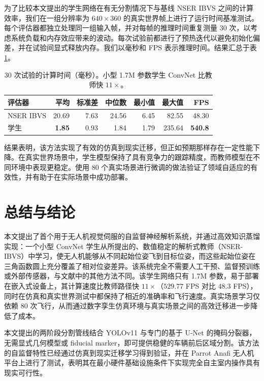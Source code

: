 \documentclass[10pt,twocolumn,letterpaper]{article}
\begin{document}
为了比较本文提出的学生网络在有无分割情况下与基线 NSER IBVS 之间的计算效率，我们在一组分辨率为 $640 \times 360$ 的真实世界帧上进行了运行时间基准测试。每个评估器都独立处理同一组输入帧，并对每帧的推理时间重复测量 30 次，以考虑系统负载和内存效应带来的波动。每次试验前都进行了预热迭代以避免初始化偏差，并在试验间显式释放内存。我们以毫秒和 FPS 表示推理时间。结果汇总于表 \ref{tab:nn-timing-eval}。

\begin{table}[t]
\centering
\footnotesize
\caption{30 次试验的计算时间（毫秒）。小型 1.7M 参数学生 ConvNet 比教师快 $11\times$。}
\label{tab:nn-timing-eval}
\begin{tabular}{lrrrrrr}
\toprule
\textbf{评估器} & \textbf{平均} & \textbf{标准差} & \textbf{中位数} & \textbf{最小值} & \textbf{最大值} & \textbf{FPS} \\
\midrule
NSER IBVS & 20.69 & 7.63 & 24.56 & 6.45 & 82.55 & 48.30 \\
学生 & \textbf{1.85} & 0.93 & 1.84 & 1.79 & 235.64 & \textbf{540.8} \\
\bottomrule
\end{tabular}
\end{table}

结果表明，该方法实现了有效的仿真到现实迁移，但正如预期那样存在一定性能下降。在真实世界场景中，学生模型保持了具有竞争力的跟踪精度，而教师模型在不同环境中表现更稳定。使用 80 个真实场景进行微调的做法验证了领域自适应的有效性，并有助于在实际场景中成功部署。

\section{总结与结论}
\label{sec:conclusion}
本文提出了首个用于无人机视觉伺服的自监督神经解析系统，并通过高效知识蒸馏实现：一个小型 ConvNet 学生从所提出的、数值稳定的解析式教师（NSER-IBVS）中学习，使无人机能够从不同起始位姿飞到目标位姿，而这些起始位姿在三角函数圆上充分覆盖了相对位姿差异。该系统完全不需要人工干预、监督预训练或外部传感器，与文献中的其他方法不同。该学生网络只有 1.7M 参数，易于部署在嵌入式设备上，其计算速度比教师路径快 $11\times$（$529.77$ FPS 对比 $48.3$ FPS），同时在仿真和真实世界测试中都保持了相近的准确率和飞行速度。真实场景学习仅依赖 80 次飞行，从而通过数字孪生仿真环境与真实场景之间的高效迁移进一步降低了成本。

本文提出的两阶段分割管线结合 YOLOv11 与专门的基于 U-Net 的掩码分裂器，无需显式几何模型或 fiducial marker，即可提供稳健的车辆前后区域分割。该方法的自监督特性已经通过仿真到现实迁移学习得到验证，并在 Parrot Anafi 无人机平台上进行了测试，表明其在最小硬件基础设施条件下实现完全自主室内操作具有现实可行性。
\end{document}
